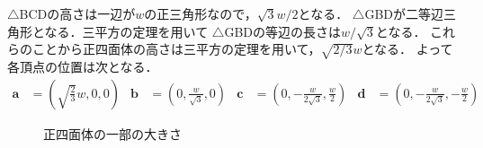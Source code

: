 
\homework




$\triangle$BCDの高さは一辺が$w$の正三角形なので，$\sqrt{3}w/2$となる．
$\triangle$GBDが二等辺三角形となる．三平方の定理を用いて
$\triangle$GBDの等辺の長さは$w/\sqrt{3}$となる．
これらのことから正四面体の高さは三平方の定理を用いて，$\sqrt{2/3}w$となる．
よって各頂点の位置は次となる．
\begin{align*}
	\bm{a} &= \left(\sqrt{\frac{2}{3}}w, 0, 0\right) &
	\bm{b} &= \left(0, \frac{w}{\sqrt{3}}, 0\right) &
	\bm{c} &= \left(0, -\frac{w}{2\sqrt{3}}, \frac{w}{2}\right) &
	\bm{d} &= \left(0, -\frac{w}{2\sqrt{3}}, -\frac{w}{2}\right)
\end{align*}


\begin{figure}[htbp]
	\centering
	
	\hspace{4\zw}
	
	\caption{正四面体の一部の大きさ}
	\label{fig:hw2-1}
\end{figure}




